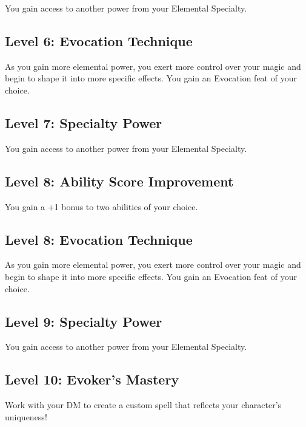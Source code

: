 \documentclass[12pt,letterpaper,twocolumn,openany,nodeprecatedcode,bg=none]{dndbook}
\begin{document}
You gain access to another power from your Elemental Specialty.

\subsection{Level 6: Evocation
Technique}\label{level-6-evocation-technique}

As you gain more elemental power, you exert more control over your magic
and begin to shape it into more specific effects. You gain an Evocation
feat of your choice.

\subsection{Level 7: Specialty Power}\label{level-7-specialty-power}

You gain access to another power from your Elemental Specialty.

\subsection{Level 8: Ability Score
Improvement}\label{level-8-ability-score-improvement}

You gain a +1 bonus to two abilities of your choice.

\subsection{Level 8: Evocation
Technique}\label{level-8-evocation-technique}

As you gain more elemental power, you exert more control over your magic
and begin to shape it into more specific effects. You gain an Evocation
feat of your choice.

\subsection{Level 9: Specialty Power}\label{level-9-specialty-power}

You gain access to another power from your Elemental Specialty.

\subsection{Level 10: Evoker's Mastery}\label{level-10-evokers-mastery}

Work with your DM to create a custom spell that reflects your
character's uniqueness!
\end{document}
